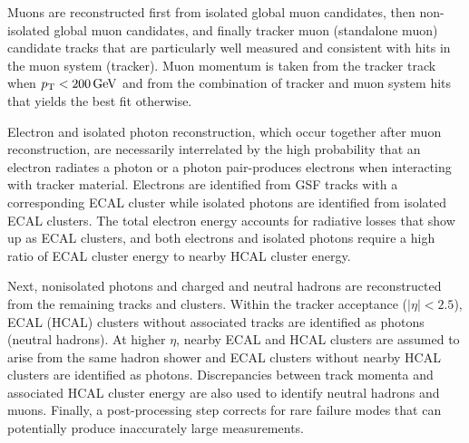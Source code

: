 Muons are reconstructed first from isolated global muon candidates, then non-isolated global muon candidates, and finally tracker muon (standalone muon) candidate tracks that are particularly well measured and consistent with hits in the muon system (tracker). Muon momentum is taken from the tracker track when $\pt<\SI{200}{\GeV}$ and from the combination of tracker and muon system hits that yields the best fit otherwise.

Electron and isolated photon reconstruction, which occur together after muon reconstruction, are necessarily interrelated by the high probability that an electron radiates a photon or a photon pair-produces electrons when interacting with tracker material. Electrons are identified from GSF tracks with a corresponding ECAL cluster while isolated photons are identified from isolated ECAL clusters. The total electron energy accounts for radiative losses that show up as ECAL clusters, and both electrons and isolated photons require a high ratio of ECAL cluster energy to nearby HCAL cluster energy.

Next, nonisolated photons and charged and neutral hadrons are reconstructed from the remaining tracks and clusters. Within the tracker acceptance ($|\eta|<2.5$), ECAL (HCAL) clusters without associated tracks are identified as photons (neutral hadrons). At higher $\eta$, nearby ECAL and HCAL clusters are assumed to arise from the same hadron shower and ECAL clusters without nearby HCAL clusters are identified as photons. Discrepancies between track momenta and associated HCAL cluster energy are also used to identify neutral hadrons and muons. Finally, a post-processing step corrects for rare failure modes that can potentially produce inaccurately large \ptmiss measurements.



\pagebreak